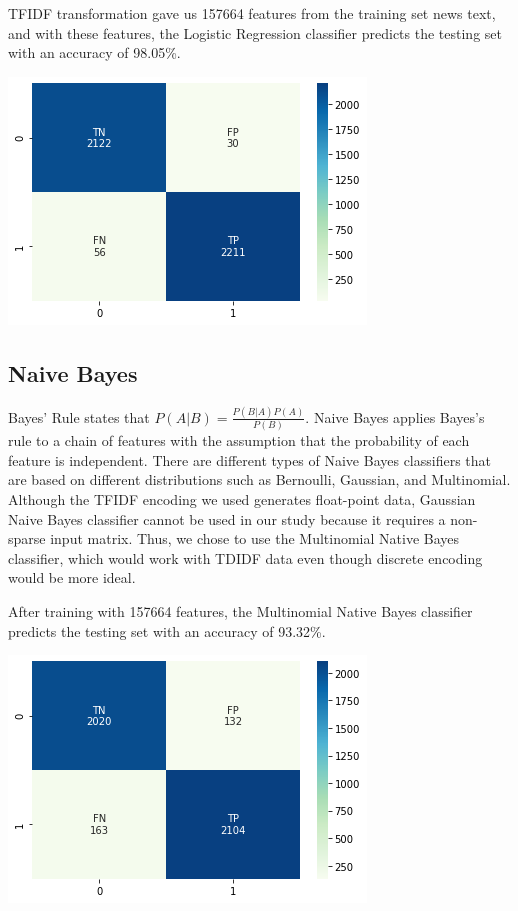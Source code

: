 \documentclass{article}
\begin{document}
\begin{multicols}{2}
TFIDF transformation gave us 157664 features from the training set news text, and with these features, the Logistic Regression classifier predicts the testing set with an accuracy of 98.05\%.
\begin{center}
\includegraphics[scale=0.4]{images/lrcm.png}
\end{center}
\subsection{Naive Bayes}
Bayes' Rule states that $P(A|B)=\frac{P(B|A)P(A)}{P(B)}$. Naive Bayes applies Bayes's rule to a chain of features with the assumption that the probability of each feature is independent. There are different types of Naive Bayes classifiers that are based on different distributions such as Bernoulli, Gaussian, and Multinomial. Although the TFIDF encoding we used generates float-point data, Gaussian Naive Bayes classifier cannot be used in our study because it requires a non-sparse input matrix. Thus, we chose to use the Multinomial Native Bayes classifier, which would work with TDIDF data even though discrete encoding would be more ideal. 

After training with 157664 features, the Multinomial Native Bayes classifier predicts the testing set with an accuracy of 93.32\%.

\begin{center}
\includegraphics[scale=0.4]{images/nbcm.png}
\end{center}


\end{multicols}
\end{document}

